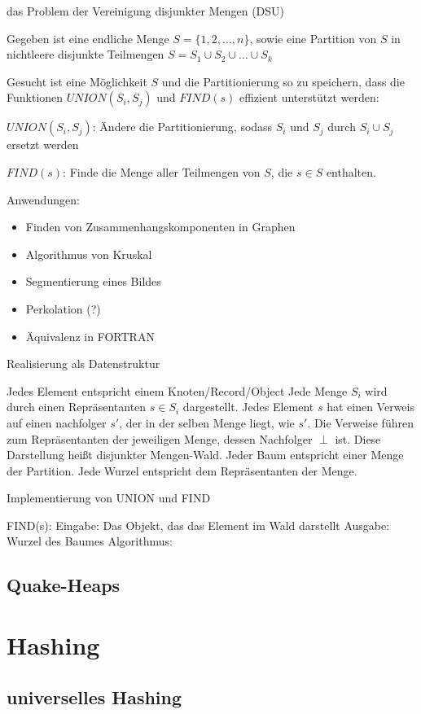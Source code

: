das Problem der Vereinigung disjunkter Mengen (DSU)

Gegeben ist eine endliche Menge $S = \{1, 2, \ldots, n\}$, sowie eine Partition
von $S$ in nichtleere disjunkte Teilmengen
$S = S_1 \cup S_2 \cup \ldots \cup S_k$

Gesucht ist eine Möglichkeit $S$ und die Partitionierung so zu speichern, dass
die Funktionen $UNION(S_i, S_j)$ und $FIND(s)$ effizient unterstützt werden:

$UNION(S_i, S_j)$: Ändere die Partitionierung, sodass $S_i$ und $S_j$ durch
$S_i \cup S_j$ ersetzt werden

$FIND(s)$: Finde die Menge aller Teilmengen von $S$, die $s \in S$ enthalten.

Anwendungen:
\begin{itemize}
\item Finden von Zusammenhangskomponenten in Graphen
\item Algorithmus von Kruskal
\item Segmentierung eines Bildes
\item Perkolation (?)
\item Äquivalenz in FORTRAN
\end{itemize}

Realisierung als Datenstruktur

Jedes Element entspricht einem Knoten/Record/Object
Jede Menge $S_i$ wird durch einen Repräsentanten $s \in S_i$ dargestellt.
Jedes Element $s$ hat einen Verweis auf einen nachfolger $s'$, der in der selben
Menge liegt, wie $s'$. Die Verweise führen zum Repräsentanten der jeweiligen
Menge, dessen Nachfolger $\perp$ ist.
Diese Darstellung heißt disjunkter Mengen-Wald. Jeder Baum entspricht einer
Menge der Partition. Jede Wurzel entspricht dem Repräsentanten der Menge.

Implementierung von UNION und FIND

FIND(s): Eingabe: Das Objekt, das das Element im Wald darstellt
Ausgabe: Wurzel des Baumes
Algorithmus: 


\subsection{Quake-Heaps}


\section{Hashing}

\subsection{universelles Hashing}
